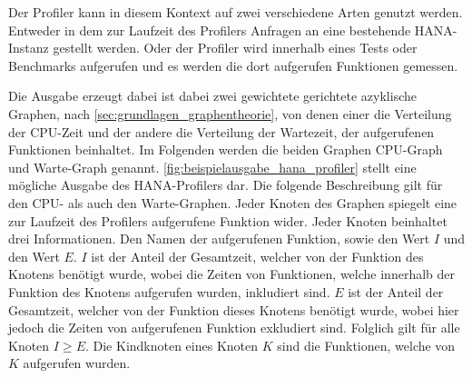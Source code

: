 Der Profiler kann in diesem Kontext auf zwei verschiedene Arten genutzt werden.
Entweder in dem zur Laufzeit des Profilers Anfragen an eine bestehende
HANA-Instanz gestellt werden. Oder der Profiler wird innerhalb eines Tests oder
Benchmarks aufgerufen und es werden die dort aufgerufen Funktionen gemessen.

Die Ausgabe erzeugt dabei ist dabei zwei gewichtete gerichtete azyklische
Graphen, nach \autoref{sec:grundlagen_graphentheorie}, von denen einer die Verteilung der CPU-Zeit und der andere die
Verteilung der Wartezeit, der aufgerufenen Funktionen beinhaltet. Im Folgenden
werden die beiden Graphen CPU-Graph und Warte-Graph genannt.
\autoref{fig:beispielausgabe_hana_profiler} stellt eine mögliche Ausgabe des
HANA-Profilers dar. Die folgende Beschreibung gilt für den CPU- als auch den
Warte-Graphen. Jeder Knoten des Graphen spiegelt eine zur Laufzeit des
Profilers aufgerufene Funktion wider. Jeder Knoten beinhaltet drei
Informationen. Den Namen der aufgerufenen Funktion, sowie den Wert $I$ und den
Wert $E$. 
$I$ ist der Anteil der Gesamtzeit, welcher
von der Funktion des Knotens benötigt wurde, wobei die Zeiten von Funktionen,
welche innerhalb der Funktion des Knotens aufgerufen wurden, inkludiert sind. 
$E$ ist der Anteil der Gesamtzeit, welcher von der Funktion dieses Knotens
benötigt wurde, wobei hier jedoch die Zeiten von aufgerufenen Funktion
exkludiert sind.
Folglich gilt für alle Knoten $I\geq E$. Die Kindknoten eines Knoten $K$ sind
die Funktionen, welche von $K$ aufgerufen wurden.

